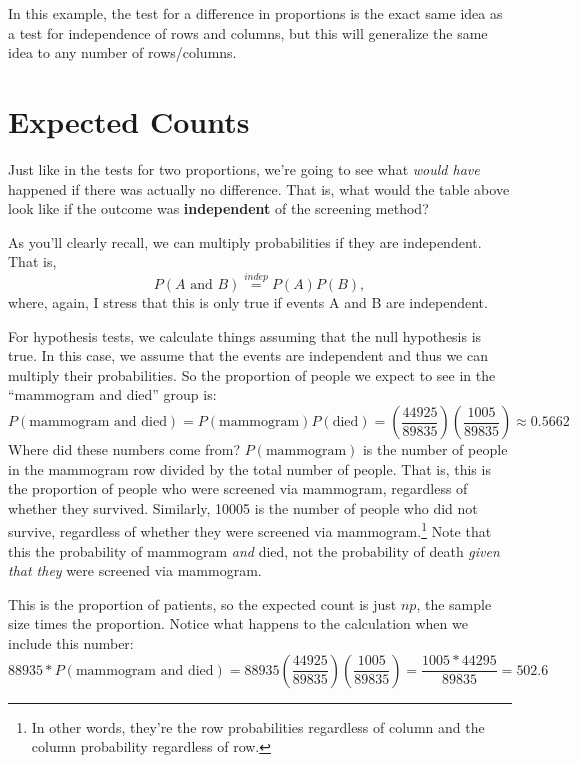\documentclass[
  letterpaper,
  DIV=11,
  numbers=noendperiod]{scrreprt}
\begin{document}
In this example, the test for a difference in proportions is the exact
same idea as a test for independence of rows and columns, but this will
generalize the same idea to any number of rows/columns.

\hypertarget{expected-counts}{%
\section{Expected Counts}\label{expected-counts}}

Just like in the tests for two proportions, we're going to see what
\emph{would have} happened if there was actually no difference. That is,
what would the table above look like if the outcome was
\textbf{independent} of the screening method?

As you'll clearly recall, we can multiply probabilities if they are
independent. That is, \[
P(A\text{ and }B) \stackrel{indep}{=}P(A)P(B),
\] where, again, I stress that this is only true if events A and B are
independent.

For hypothesis tests, we calculate things assuming that the null
hypothesis is true. In this case, we assume that the events are
independent and thus we can multiply their probabilities. So the
proportion of people we expect to see in the ``mammogram and died''
group is: \[
P(\text{mammogram and died}) = P(\text{mammogram})P(\text{died}) = \left(\frac{44925}{89835}\right)\left(\frac{1005}{89835}\right) \approx 0.5662
\] Where did these numbers come from? \(P(\text{mammogram})\) is the
number of people in the mammogram row divided by the total number of
people. That is, this is the proportion of people who were screened via
mammogram, regardless of whether they survived. Similarly, 10005 is the
number of people who did not survive, regardless of whether they were
screened via mammogram.\footnote{In other words, they're the row
  probabilities regardless of column and the column probability
  regardless of row.} Note that this the probability of mammogram
\emph{and} died, not the probability of death \emph{given that they}
were screened via mammogram.

This is the proportion of patients, so the expected count is just
\(np\), the sample size times the proportion. Notice what happens to the
calculation when we include this number: \[
88935 * P(\text{mammogram and died}) = 88935 \left(\frac{44925}{89835}\right)\left(\frac{1005}{89835}\right) = \frac{1005*44295}{89835} = 502.6
\]
\end{document}
